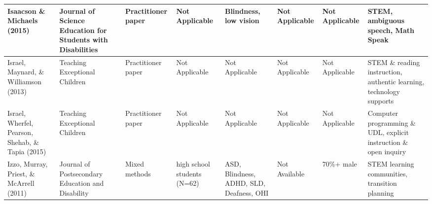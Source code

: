 \documentclass[11.5pt]{sig-alternate}
\begin{document}
\begin{@twocolumnfalse}
\begin{table}
\begin{tabular}{m{0.72in}m{0.72in}m{0.72in}m{0.72in}m{0.72in}m{0.72in}m{0.72in}m{0.72in}}
Isaacson \&   Michaels (2015)                     & Journal of Science Education for Students with Disabilities     & Practitioner paper                    &  \centering Not Applicable                                                                               & Blindness, low vision                             &  \centering Not Applicable                                                                                         &  \centering Not Applicable                                                   & STEM, ambiguous speech, Math Speak                                                                       \\ \hline
Israel, Maynard, \& Williamson (2013)                   & Teaching Exceptional Children                                   & Practitioner paper                    &  \centering Not Applicable                                                                               &  \centering Not Applicable                                    &  \centering Not Applicable                                                                                         &  \centering Not Applicable                                                   & STEM \& reading instruction, authentic learning, technology supports                                     \\ \hline
Israel, Wherfel, Pearson, Shehab, \&  Tapia (2015)   & Teaching Exceptional Children                                   & Practitioner paper                    &  \centering Not Applicable                                                                               &  \centering Not Applicable                                    &  \centering Not Applicable                                                                                         &  \centering Not Applicable                                                   & Computer programming \& UDL, explicit instruction \& open inquiry                                        \\ \hline
Izzo, Murray, Priest, \&  McArrell (2011)            & Journal of Postsecondary Education and Disability               & Mixed methods                         & high school students (N=62)                                                                  & ASD, Blindness, ADHD, SLD, Deafness, OHI          &  \centering Not Available                                                                                          & 70\%+ male                                                       & STEM learning communities, transition planning                                                           \\ \hline

\end{tabular}
\end{table}
\end{@twocolumnfalse}
\end{document}
